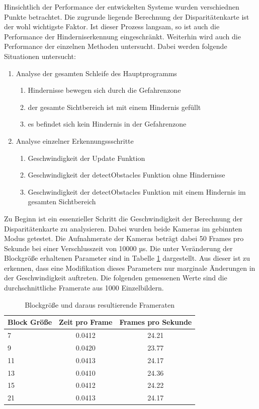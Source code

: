 Hinsichtlich der Performance der entwickelten Systeme wurden verschiednen Punkte betrachtet. Die zugrunde liegende Berechnung der Disparitätenkarte ist der wohl wichtigste Faktor. Ist dieser Prozess langsam, so ist auch die Performance der Hinderniserkennung eingeschränkt. Weiterhin wird auch die Performance der einzelnen Methoden untersucht. Dabei werden folgende Situationen untersucht:
\begin{enumerate}
	\item Analyse der gesamten Schleife des Hauptprogramms
	\begin{enumerate}
		\item Hindernisse bewegen sich durch die Gefahrenzone
		\item der gesamte Sichtbereich ist mit einem Hindernis gefüllt
		\item es befindet sich kein Hindernis in der Gefahrenzone
	\end{enumerate}
	\item Analyse einzelner Erkennungssschritte
	\begin{enumerate}
		\item Geschwindigkeit der Update Funktion
		\item Geschwindigkeit der detectObstacles Funktion ohne Hindernisse
		\item Geschwindigkeit der detectObstacles Funktion mit einem Hindernis im gesamten Sichtbereich
	\end{enumerate}
\end{enumerate}

\noindent
Zu Beginn ist ein essenzieller Schritt die Geschwindigkeit der Berechnung der Disparitätenkarte zu analysieren. Dabei wurden beide Kameras im gebinnten Modus getestet. Die Aufnahmerate der Kameras beträgt dabei 50 Frames pro Sekunde bei einer Verschlusszeit von 10000 µs. Die unter Veränderung der Blockgröße erhaltenen Parameter sind in Tabelle \ref{tbl:disparity_framerate} dargestellt. Aus dieser ist zu erkennen, dass eine Modifikation dieses Parameters nur marginale Änderungen in der Geschwindigkeit auftreten. Die folgenden gemessenen Werte sind die durchschnittliche Framerate aus 1000 Einzelbildern.

\begin{table}[h]
	\centering
	\begin{tabular}{|l|c|c|}
	\hline
	Block Größe & Zeit pro Frame & Frames pro Sekunde \\ \hline
	7           & 0.0412         & 24.21              \\ \hline
	9           & 0.0420         & 23.77              \\ \hline
	11          & 0.0413         & 24.17              \\ \hline
	13          & 0.0410         & 24.36              \\ \hline
	15          & 0.0412         & 24.22              \\ \hline
	21          & 0.0413         & 24.17              \\ \hline
	\end{tabular}
	\caption{Blockgröße und daraus resultierende Frameraten}
	\label{tbl:disparity_framerate}
\end{table}


